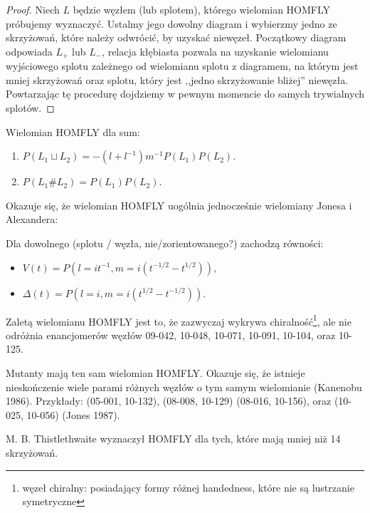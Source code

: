 \begin{proof}
Niech $L$ będzie węzłem (lub splotem), którego wielomian HOMFLY próbujemy wyznaczyć.
Ustalmy jego dowolny diagram i wybierzmy jedno ze skrzyżowań, które należy odwrócić, by uzyskać niewęzeł.
Początkowy diagram odpowiada $L_+$ lub $L_-$, relacja kłębiasta pozwala na uzyskanie wielomianu wyjściowego splotu zależnego od wielomianu splotu z diagramem, na którym jest mniej skrzyżowań oraz splotu, który jest ,,jedno skrzyżowanie bliżej'' niewęzła.
Powtarzając tę procedurę dojdziemy w pewnym momencie do samych trywialnych splotów.
\end{proof}


\begin{twierdzenie} Wielomian HOMFLY dla sum:
\begin{enumerate}
	\item $P(L_1 \sqcup L_2) = - (l + l^{-1}) m^{-1} P(L_1) P(L_2)$.
	\item $P(L_1 \# L_2) = P(L_1) P(L_2)$.
\end{enumerate}
\end{twierdzenie}

Okazuje się, że wielomian HOMFLY uogólnia jednocześnie wielomiany Jonesa i Alexandera:

\begin{twierdzenie} Dla dowolnego (splotu / węzła, nie/zorientowanego?) zachodzą równości:
\begin{itemize}
\item $V(t) = P(l = it^{-1}, m = i(t^{-1/2} - t^{1/2}))$,
\item $\Delta(t) = P(l = i, m = i(t^{1/2} - t^{-1/2}))$.
\end{itemize}
\end{twierdzenie}

Zaletą wielomianu HOMFLY jest to, że zazwyczaj wykrywa chiralność\footnote{węzeł chiralny: posiadający formy różnej handedness, które nie są lustrzanie symetryczne}, ale nie odróżnia enancjomerów węzłów 09-042, 10-048, 10-071, 10-091, 10-104, oraz 10-125.

Mutanty mają ten sam wielomian HOMFLY.
Okazuje się, że istnieje nieskończenie wiele parami różnych węzłów o tym samym wielomianie (Kanenobu 1986).
Przykłady:  (05-001, 10-132), (08-008, 10-129) (08-016, 10-156), oraz (10-025, 10-056) (Jones 1987).

M. B. Thistlethwaite wyznaczył HOMFLY dla tych, które mają mniej niż 14 skrzyżowań.